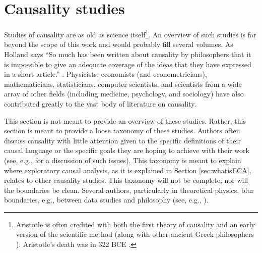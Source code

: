 \chapter{Causality studies} 
\label{sec:studies}
Studies of causality are as old as science itself\footnote{Aristotle is often credited with both the first theory of causality \cite{Falcon2008,Evans1959} and an early version of the scientific method \cite{Bolduan1945} (along with other ancient Greek philosophers \cite{Popper1998}).  Aristotle's death was in 322 BCE \cite{During1957}.}.  An overview of such studies is far beyond the scope of this work and would probably fill several volumes.  As Holland says ``So much has been written about causality by philosophers that it is impossible to give an adequate coverage of the ideas that they have expressed in a short article.'' \cite{Holland1986}.  Physicists, economists (and econometricians), mathematicians, statisticians, computer scientists, and scientists from a wide array of other fields (including medicine, psychology, and sociology) have also contributed greatly to the vast body of literature on causality.  

This section is not meant to provide an overview of these studies.  Rather, this section is meant to provide a loose taxonomy of these studies.  Authors often discuss causality with little attention given to the specific definitions of their causal language or the specific goals they are hoping to achieve with their work (see, e.g., \cite{Holland1986,Granger1980} for a discussion of such issues).  This taxonomy is meant to explain where exploratory causal analysis, as it is explained in Section \ref{sec:whatisECA}, relates to other causality studies.  This taxonomy will not be complete, nor will the boundaries be clean.  Several authors, particularly in theoretical physics, blur boundaries, e.g., between data studies and philosophy (see, e.g., \cite{Bunge1979}).

